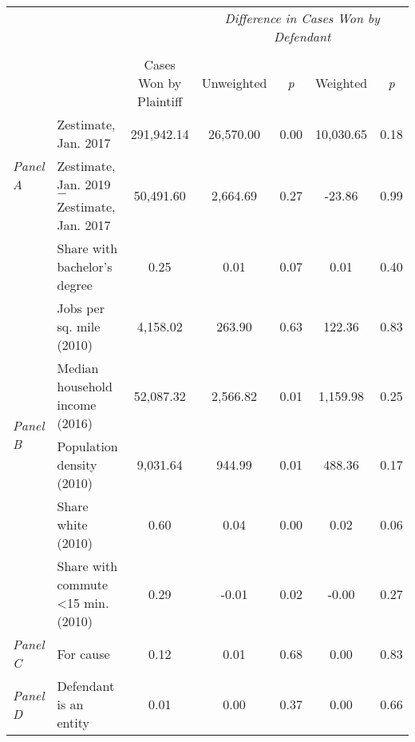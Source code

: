 \begin{tabular}{llccccc}
\toprule
 &  & \textit{} & \multicolumn{4}{c}{\textit{Difference in Cases Won by Defendant}} \\
\cline{4-7}
\\
 &  & Cases Won by Plaintiff & Unweighted & \emph{p} & Weighted & \emph{p} \\
\midrule
\multirow[c]{2}{3cm}{\textit{Panel A}} & Zestimate, Jan. 2017 & 291,942.14 & 26,570.00 & 0.00 & 10,030.65 & 0.18 \\
 & Zestimate, Jan. 2019 $-$ Zestimate, Jan. 2017 & 50,491.60 & 2,664.69 & 0.27 & -23.86 & 0.99 \\
\cline{1-7}
\multirow[c]{6}{3cm}{\textit{Panel B}} & Share with bachelor's degree & 0.25 & 0.01 & 0.07 & 0.01 & 0.40 \\
 & Jobs per sq. mile (2010) & 4,158.02 & 263.90 & 0.63 & 122.36 & 0.83 \\
 & Median household income (2016) & 52,087.32 & 2,566.82 & 0.01 & 1,159.98 & 0.25 \\
 & Population density (2010) & 9,031.64 & 944.99 & 0.01 & 488.36 & 0.17 \\
 & Share white (2010) & 0.60 & 0.04 & 0.00 & 0.02 & 0.06 \\
 & Share with commute <15 min. (2010) & 0.29 & -0.01 & 0.02 & -0.00 & 0.27 \\
\cline{1-7}
\textit{Panel C} & For cause & 0.12 & 0.01 & 0.68 & 0.00 & 0.83 \\
\cline{1-7}
\textit{Panel D} & Defendant is an entity & 0.01 & 0.00 & 0.37 & 0.00 & 0.66 \\
\cline{1-7}
\bottomrule
\end{tabular}

